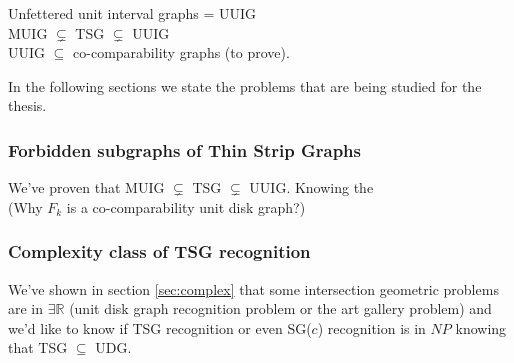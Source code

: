 Unfettered unit interval graphs = UUIG\\

MUIG $\subsetneq$ TSG $\subsetneq$ UUIG\\

UUIG $\subseteq$ co-comparability graphs (to prove).

In the following sections we state the problems that are being studied for the thesis.

\subsubsection{Forbidden subgraphs of Thin Strip Graphs}
  We've proven that MUIG $\subsetneq$ TSG $\subsetneq$ UUIG. Knowing the\\
  (Why $F_k$ is a co-comparability unit disk graph?)

\subsubsection{Complexity class of TSG recognition}
  We've shown in section \ref{sec:complex} that some intersection geometric problems are in $\exists \mathbb{R}$ (unit disk graph recognition problem or the art gallery problem) and we'd like to know if
  TSG recognition or even SG($c$) recognition is in $NP$ knowing that TSG $\subseteq$ UDG.
